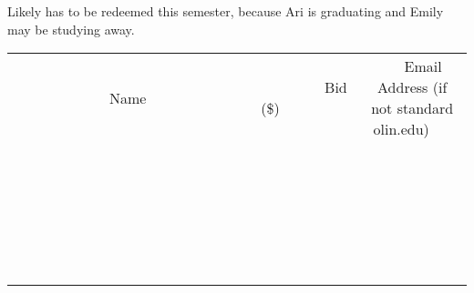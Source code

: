 \documentclass[11pt]{article}
\begin{document}
Likely has to be redeemed this semester, because Ari is graduating and Emily may be studying away.
\\[6ex]
\begin{tabular}{c c c}
~~~~~~~~~~~~~Name~~~~~~~~~~~~~ & ~~~~~~~~~Bid (\$)~~~~~~~~~  & ~~~Email Address (if not standard olin.edu)~~~\\
 & & \\
\hline
 & & \\
\hline
 & & \\
\hline
 & & \\
\hline
 & & \\
\hline
 & & \\
\hline
 & & \\
\hline
 & & \\
\hline
 & & \\
\hline
 & & \\
\hline
 & & \\
\hline
 & & \\
\hline
 & & \\
\hline
 & & \\
\hline
 & & \\
\hline
 & & \\
\hline
 & & \\
\hline
 & & \\
\hline
 & & \\
\hline
 & & \\
\hline
 & & \\
\hline
 & & \\
\hline
 & & \\
\hline
 & & \\
\hline
 & & \\
\hline
 & & \\
\hline
\end{tabular}
\newpage
\end{document}
